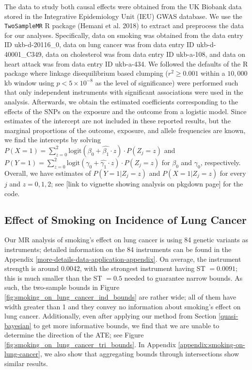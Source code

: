 \documentclass[
]{article}
\theoremstyle{plain}
\begin{document}
The data to study both causal effects were obtained from the UK Biobank data stored in the Integrative Epidemiology Unit (IEU) GWAS database. We use the \texttt{TwoSampleMR} R package (Hemani et al. 2018) to extract and preprocess the data for our analyses. Specifically, data on smoking was obtained from the data entry ID ukb-d-20116\_0, data on lung cancer was from data entry ID ukb-d-40001\_C349, data on cholesterol was from data entry ID ukb-a-108, and data on heart attack was from data entry ID ukb-a-434. We followed the defaults of the R package where linkage disequilibrium based clumping (\(r^2 \ge 0.001\) within a \(10,000\) kb window using \(p < 5 \times 10^{-8}\) as the level of significance) were performed such that only independent instruments with significant associations were used in the analysis. Afterwards, we obtain the estimated coefficients corresponding to the effects of the SNPs on the exposure and the outcome from a logistic model. Since estimates of the intercept are not included in these reported results, but the marginal proportions of the outcome, exposure, and allele frequencies are known, we find the intercepts by solving \(P(X = 1) = \sum_{z = 0}^2\text{logit}(\beta_0 + \hat{\beta_1}\cdot z)\cdot P(Z_j = z)\) and \(P(Y = 1) = \sum_{z = 0}^2\text{logit}(\gamma_0 + \hat{\gamma_1}\cdot z)\cdot P(Z_j = z)\) for \(\beta_0\) and \(\gamma_0\), respectively. Overall, we have estimates of \(P(Y = 1 | Z_j = z)\) and \(P(X = 1 | Z_j = z)\) for every \(j\) and \(z=0,1,2\); see {[}link to vignette showing analysis on pkgdown page{]} for the code.

\hypertarget{effect-of-smoking-on-incidence-of-lung-cancer}{%
\subsection{\texorpdfstring{Effect of Smoking on Incidence of Lung Cancer \label{smoking-effect-on-lung-cancer}}{Effect of Smoking on Incidence of Lung Cancer }}\label{effect-of-smoking-on-incidence-of-lung-cancer}}

Our MR analysis of smoking's effect on lung cancer is using 84 genetic variants as instruments; detailed information on the 84 instruments can be found in the Appendix \ref{more-details-data-application-appendix}. On average, the instrument strength is around 0.0042, with the strongest instrument having ST \(= 0.0091\); this is much smaller than the ST \(= 0.5\) needed to guarantee narrow bounds. As such, the two-sample bounds in Figure \ref{fig:smoking_on_lung_cancer_ind_bounds} are rather wide; all of them have width greater than 1 and they convey no information about smoking's effect on lung cancer. Additionally, even after applying our method from Section \ref{quasi-bayesian} to get more informative bounds, we find that we are unable to determine the direction of the ATE; see Figure \ref{fig:smoking_on_lung_cancer_tri_bounds}. In Appendix \ref{appendix:smoking-on-lung-cancer}, we also show that aggregating bounds through intersections show similar results.
\end{document}
